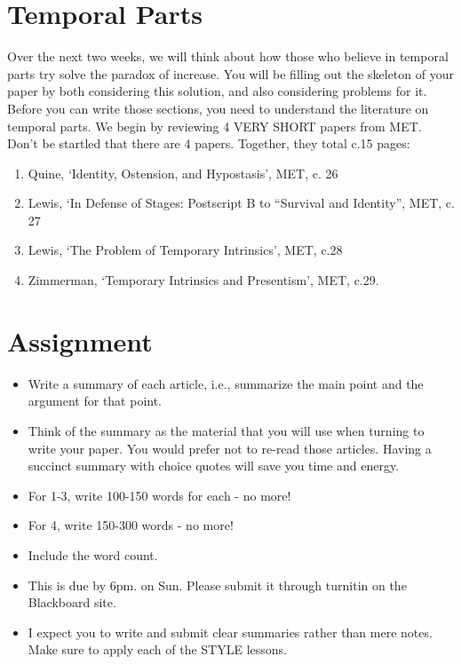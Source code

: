 \documentclass[oneside]{article}
\begin{document}
\thispagestyle{fancy}


\section*{Temporal Parts}

Over the next two weeks, we will think about how those who believe in temporal parts try solve the paradox of increase. You will be filling out the skeleton of your paper by both considering this solution, and also considering problems for it. Before you can write those sections, you need to understand the literature on temporal parts. We begin by reviewing 4 VERY SHORT papers from MET. Don't be startled that there are 4 papers. Together, they total c.15 pages: 

\begin{enumerate}
\item Quine, `Identity, Ostension, and Hypostasis', MET, c. 26
\item Lewis, `In Defense of Stages: Postscript B to ``Survival and Identity'', MET, c. 27
\item Lewis, `The Problem of Temporary Intrinsics', MET, c.28
\item Zimmerman, `Temporary Intrinsics and Presentism', MET, c.29. 
\end{enumerate}

\section*{Assignment}

\begin{itemize}  
\item Write a summary of each article, i.e., summarize the main point and the argument for that point. 
\item Think of the summary as the material that you will use when turning to write your paper. You would prefer not to re-read those articles. Having a succinct summary with choice quotes will save you time and energy. 
\item For 1-3, write 100-150 words for each - no more!
\item For 4, write 150-300 words - no more!
\item Include the word count. 
\item This is due by 6pm. on Sun. Please submit it through turnitin on the Blackboard site. 
\item I expect you to write and submit clear summaries rather than mere notes. Make sure to apply each of the STYLE lessons. 
\end{itemize}
\end{document}
